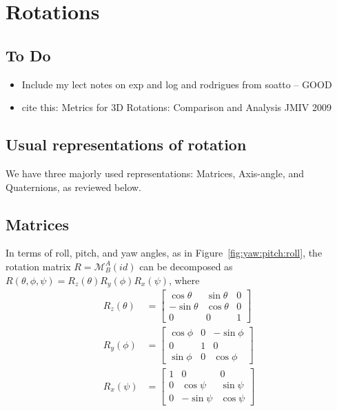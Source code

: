 \mynewpage
\chapter{Rotations}

\section{To Do}

\begin{itemize}
\item Include my lect notes on exp and log and rodrigues from soatto -- GOOD
\item cite this: Metrics for 3D Rotations: Comparison and Analysis JMIV 2009
\end{itemize}


\section{Usual representations of rotation}
We have three majorly used representations: Matrices,
Axis-angle, and Quaternions, as reviewed below.

\section{Matrices}
In terms of roll, pitch, and yaw angles, as in Figure~\ref{fig:yaw:pitch:roll}, the rotation matrix $R = \mathcal M^A_B(id)$ can be decomposed
as $R(\theta,\phi,\psi) =
R_z(\theta)R_y(\phi)R_x(\psi)$, where
\begin{align}
R_z(\theta) &= \begin{bmatrix}
\cos\theta & \sin\theta & 0\\
-\sin\theta & \cos\theta & 0\\
0 & 0 & 1
\end{bmatrix}\\
%
R_y(\phi) &= \begin{bmatrix}
\cos\phi & 0 & -\sin\phi\\
0 & 1 & 0\\
\sin\phi &0 &\cos\phi
\end{bmatrix}\\
%
R_x(\psi) &= \begin{bmatrix}
1 & 0 & 0\\
0 & \cos\psi & \sin\psi\\
0 &-\sin\psi & \cos\psi
\end{bmatrix}
\end{align}

